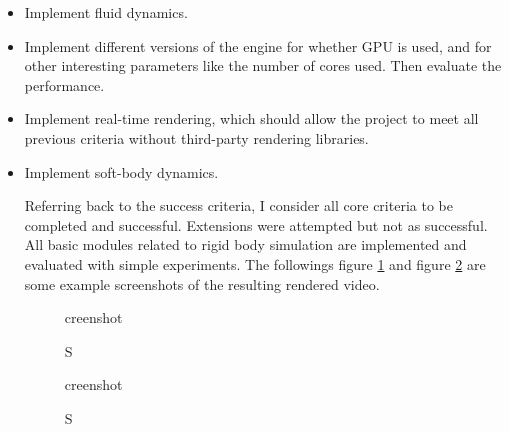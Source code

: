 \documentclass[12pt,a4paper,twoside,openright]{report}
\begin{document}
\begin{itemize}
\item Implement fluid dynamics.

\item Implement different versions of the engine for whether GPU is used, and for other interesting parameters like the number of cores used. 
Then evaluate the performance.

\item Implement real-time rendering, which should allow the project to meet all previous criteria without third-party rendering libraries. 

\item Implement soft-body dynamics.

Referring back to the success criteria, I consider all core criteria to be completed and successful. Extensions were attempted but not as successful. All basic modules related to rigid body simulation are implemented and evaluated with simple experiments. The followings figure \ref{sc1} and figure \ref{sc2} are some example screenshots of the resulting rendered video.

\begin{figure}\label{sc1}
  \caption Screenshot
\end{figure}

\begin{figure}\label{sc2}
    \caption Screenshot
  \end{figure}


\end{itemize}
\end{document}
